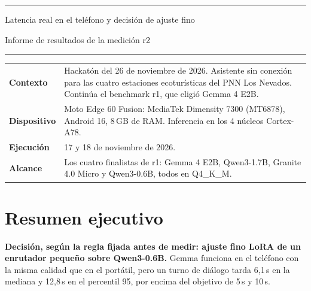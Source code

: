 \documentclass[11pt,a4paper]{article}
\begin{document}
\thispagestyle{empty}
\vspace*{-6mm}
{\color{accent}\rule{\textwidth}{1.2pt}}

\vspace{5mm}
{\huge\bfseries\raggedright Latencia real en el teléfono y decisión de ajuste fino\par}
\vspace{3mm}
{\Large Informe de resultados de la medición r2\par}
\vspace{5mm}
{\color{accent}\rule{\textwidth}{0.4pt}}

\vspace{5mm}
\begin{tabularx}{\textwidth}{@{}lL@{}}
\textbf{Contexto} & Hackatón del 26 de noviembre de 2026. Asistente sin conexión para las cuatro estaciones ecoturísticas del PNN Los Nevados. Continúa el benchmark r1, que eligió Gemma 4 E2B.\\[3pt]
\textbf{Dispositivo} & Moto Edge 60 Fusion: MediaTek Dimensity 7300 (MT6878), Android 16, 8\,GB de RAM. Inferencia en los 4 núcleos Cortex-A78.\\[3pt]
\textbf{Ejecución} & 17 y 18 de noviembre de 2026.\\[3pt]
\textbf{Alcance} & Los cuatro finalistas de r1: Gemma 4 E2B, Qwen3-1.7B, Granite 4.0 Micro y Qwen3-0.6B, todos en Q4\_K\_M.\\
\end{tabularx}

\vspace{6mm}
\section*{Resumen ejecutivo}

\textbf{Decisión, según la regla fijada antes de medir: ajuste fino LoRA de un enrutador pequeño sobre Qwen3-0.6B.} Gemma funciona en el teléfono con la misma calidad que en el portátil, pero un turno de diálogo tarda 6,1\,s en la mediana y 12,8\,s en el percentil 95, por encima del objetivo de 5\,s y 10\,s.
\end{document}

